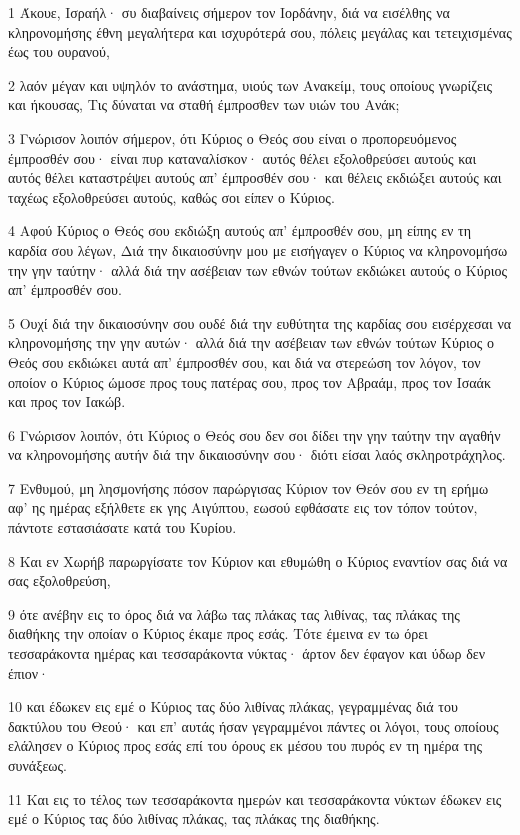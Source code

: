 \par 1 Άκουε, Ισραήλ· συ διαβαίνεις σήμερον τον Ιορδάνην, διά να εισέλθης να κληρονομήσης έθνη μεγαλήτερα και ισχυρότερά σου, πόλεις μεγάλας και τετειχισμένας έως του ουρανού,
\par 2 λαόν μέγαν και υψηλόν το ανάστημα, υιούς των Ανακείμ, τους οποίους γνωρίζεις και ήκουσας, Τις δύναται να σταθή έμπροσθεν των υιών του Ανάκ;
\par 3 Γνώρισον λοιπόν σήμερον, ότι Κύριος ο Θεός σου είναι ο προπορευόμενος έμπροσθέν σου· είναι πυρ καταναλίσκον· αυτός θέλει εξολοθρεύσει αυτούς και αυτός θέλει καταστρέψει αυτούς απ' έμπροσθέν σου· και θέλεις εκδιώξει αυτούς και ταχέως εξολοθρεύσει αυτούς, καθώς σοι είπεν ο Κύριος.
\par 4 Αφού Κύριος ο Θεός σου εκδιώξη αυτούς απ' έμπροσθέν σου, μη είπης εν τη καρδία σου λέγων, Διά την δικαιοσύνην μου με εισήγαγεν ο Κύριος να κληρονομήσω την γην ταύτην· αλλά διά την ασέβειαν των εθνών τούτων εκδιώκει αυτούς ο Κύριος απ' έμπροσθέν σου.
\par 5 Ουχί διά την δικαιοσύνην σου ουδέ διά την ευθύτητα της καρδίας σου εισέρχεσαι να κληρονομήσης την γην αυτών· αλλά διά την ασέβειαν των εθνών τούτων Κύριος ο Θεός σου εκδιώκει αυτά απ' έμπροσθέν σου, και διά να στερεώση τον λόγον, τον οποίον ο Κύριος ώμοσε προς τους πατέρας σου, προς τον Αβραάμ, προς τον Ισαάκ και προς τον Ιακώβ.
\par 6 Γνώρισον λοιπόν, ότι Κύριος ο Θεός σου δεν σοι δίδει την γην ταύτην την αγαθήν να κληρονομήσης αυτήν διά την δικαιοσύνην σου· διότι είσαι λαός σκληροτράχηλος.
\par 7 Ενθυμού, μη λησμονήσης πόσον παρώργισας Κύριον τον Θεόν σου εν τη ερήμω αφ' ης ημέρας εξήλθετε εκ γης Αιγύπτου, εωσού εφθάσατε εις τον τόπον τούτον, πάντοτε εστασιάσατε κατά του Κυρίου.
\par 8 Και εν Χωρήβ παρωργίσατε τον Κύριον και εθυμώθη ο Κύριος εναντίον σας διά να σας εξολοθρεύση,
\par 9 ότε ανέβην εις το όρος διά να λάβω τας πλάκας τας λιθίνας, τας πλάκας της διαθήκης την οποίαν ο Κύριος έκαμε προς εσάς. Τότε έμεινα εν τω όρει τεσσαράκοντα ημέρας και τεσσαράκοντα νύκτας· άρτον δεν έφαγον και ύδωρ δεν έπιον·
\par 10 και έδωκεν εις εμέ ο Κύριος τας δύο λιθίνας πλάκας, γεγραμμένας διά του δακτύλου του Θεού· και επ' αυτάς ήσαν γεγραμμένοι πάντες οι λόγοι, τους οποίους ελάλησεν ο Κύριος προς εσάς επί του όρους εκ μέσου του πυρός εν τη ημέρα της συνάξεως.
\par 11 Και εις το τέλος των τεσσαράκοντα ημερών και τεσσαράκοντα νύκτων έδωκεν εις εμέ ο Κύριος τας δύο λιθίνας πλάκας, τας πλάκας της διαθήκης.
